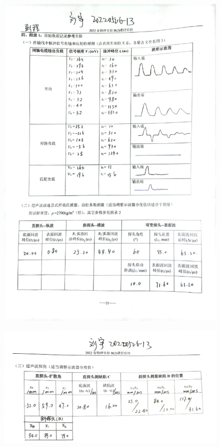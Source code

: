 \documentclass[UTF8]{ctexart}
\begin{document}
\begin{figure}[H]
  \centering
  \includegraphics[scale=0.13]{记录1.jpg}
\end{figure}

\begin{figure}[H]
  \centering
  \includegraphics[scale=0.13]{记录2.jpg}
\end{figure}
\end{document}
